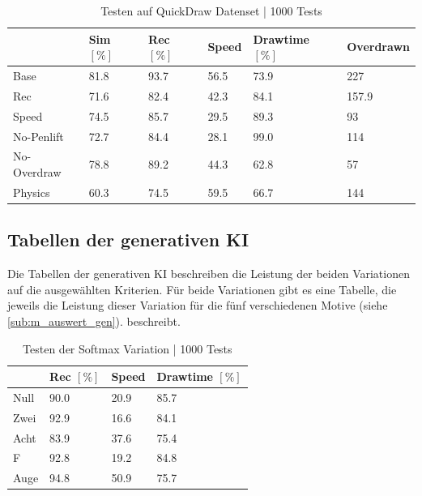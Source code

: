 \begin{table}[!ht]
    \centering
    \caption{Testen auf QuickDraw Datenset | 1000 Tests}\label{tab:Quickdraw}
    \begin{tabular}{|l|l|l|l|l|l|}
        \hline ~ & Sim $[\%]$ & Rec $[\%]$ & Speed & Drawtime $[\%]$ & Overdrawn \\ \hline
        Base & 81.8 & 93.7 & 56.5 & 73.9 & 227 \\ \hline
        Rec & 71.6 & 82.4 & 42.3 & 84.1 & 157.9 \\ \hline
        Speed & 74.5 & 85.7 & 29.5 & 89.3 & 93 \\ \hline
        No-Penlift & 72.7 & 84.4 & 28.1 & 99.0 & 114 \\ \hline
        No-Overdraw & 78.8 & 89.2 & 44.3 & 62.8 & 57 \\ \hline
        Physics & 60.3 & 74.5 & 59.5 & 66.7 & 144 \\ \hline
    \end{tabular}
\end{table}


\subsection{Tabellen der generativen KI}\label{sub:r_tab_gen} Die Tabellen der
generativen KI beschreiben die Leistung der beiden Variationen auf die
ausgewählten Kriterien. Für beide Variationen gibt es eine Tabelle, die jeweils
die Leistung dieser Variation für die fünf verschiedenen Motive (siehe
\ref{sub:m_auswert_gen}). beschreibt. 


\begin{table}[!ht]
    \centering
    \caption{Testen der Softmax Variation | 1000 Tests}\label{tab:gen-softmax}
    \begin{tabular}{|l|l|l|l|}
    \hline
        ~ & Rec $[\%]$ & Speed & Drawtime $[\%]$ \\ \hline
        Null & 90.0 & 20.9 & 85.7 \\ \hline
        Zwei & 92.9 & 16.6 & 84.1 \\ \hline
        Acht & 83.9 & 37.6 & 75.4 \\ \hline
        F & 92.8 & 19.2 & 84.8 \\ \hline
        Auge & 94.8 & 50.9 & 75.7 \\ \hline
    \end{tabular}
\end{table}

